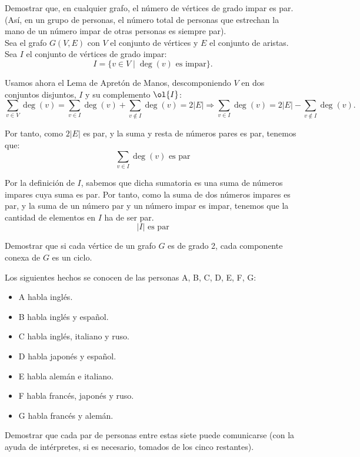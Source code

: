 \begin{ejercicio}\label{ej:1.6}
    Demostrar que, en cualquier grafo, el número de vértices de grado impar es par.
    (Así, en un grupo de personas, el número total de personas que estrechan la mano de un número impar de otras personas es siempre par).\\

    Sea el grafo $G(V,E)$ con $V$ el conjunto de vértices y $E$ el conjunto de aristas.    
    Sea $I$ el conjunto de vértices de grado impar:
    \begin{equation*}
        I=\{v\in V\mid \deg(v)\text{ es impar}\}.
    \end{equation*}

    Usamos ahora el Lema de Apretón de Manos, descomponiendo $V$ en dos conjuntos disjuntos, $I$ y su complemento $\ol{I}$:
    \begin{equation*}
        \sum_{v\in V}\deg(v)=\sum_{v\in I}\deg(v)+\sum_{v\notin I}\deg(v) =
        2|E| \Longrightarrow
        \sum_{v\in I}\deg(v) = 2|E| - \sum_{v\notin I}\deg(v).
    \end{equation*}

    Por tanto, como $2|E|$ es par, y la suma y resta de números pares es par, tenemos que:
    \begin{equation*}
        \sum_{v\in I}\deg(v) \text{ es par}
    \end{equation*}

    Por la definición de $I$, sabemos que dicha sumatoria es una suma de números impares cuya suma es par. Por tanto, como la suma de dos números impares es par, y la suma de un número par y un número impar es impar, tenemos que la cantidad de elementos en $I$ ha de ser par.
    \begin{equation*}
        |I| \text{ es par}
    \end{equation*}
\end{ejercicio}

\begin{ejercicio}\label{ej:1.7}
    Demostrar que si cada vértice de un grafo $G$ es de grado 2, cada componente conexa de $G$ es un ciclo.
\end{ejercicio}

\begin{ejercicio}\label{ej:1.8}
    Los siguientes hechos se conocen de las personas A, B, C, D, E, F, G:
    \begin{itemize}
        \item A habla inglés.
        \item B habla inglés y español.
        \item C habla inglés, italiano y ruso.
        \item D habla japonés y español.
        \item E habla alemán e italiano.
        \item F habla francés, japonés y ruso.
        \item G habla francés y alemán.
    \end{itemize}
    Demostrar que cada par de personas entre estas siete puede comunicarse (con la ayuda de intérpretes, si es necesario, tomados de los cinco restantes).
\end{ejercicio}

